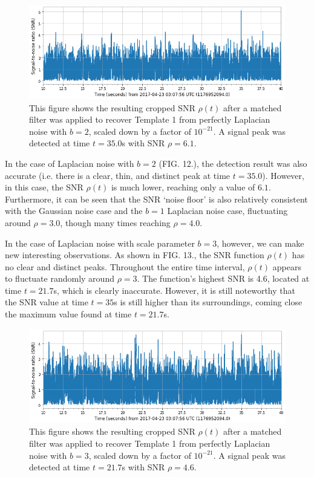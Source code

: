 \documentclass[reprint,
letterpaper,
 amsmath,amssymb,
 aps,
]{revtex4-2}
\begin{document}
\begin{figure}[h!]
\caption{This figure shows the resulting cropped SNR $\rho(t)$ after a matched filter was applied to recover Template 1 from perfectly Laplacian noise with $b=2$, scaled down by a factor of $10^{-21}$. A signal peak was detected at time $t = 35.0$s with SNR $\rho = 6.1$.}
\includegraphics[scale = .33]{laplacian b=2 template 1.png}
\centering
\end{figure} 
In the case of Laplacian noise with $b=2$ (FIG. 12.), the detection result was also accurate (i.e. there is a clear, thin, and distinct peak at time $t=35.0$). However, in this case, the SNR $\rho(t)$ is much lower, reaching only a value of $6.1$. Furthermore, it can be seen that the SNR `noise floor' is also relatively consistent with the Gaussian noise case and the $b=1$ Laplacian noise case, fluctuating around $\rho = 3.0$, though many times reaching $\rho = 4.0$.

In the case of Laplacian noise with scale parameter $b=3$, however, we can make new interesting observations. As shown in FIG. 13., the SNR function $\rho(t)$ has no clear and distinct peaks. Throughout the entire time interval, $\rho(t)$ appears to fluctuate randomly around $\rho = 3$. The function's highest SNR is 4.6, located at time $t=21.7$s, which is clearly inaccurate. However, it is still noteworthy that the SNR value at time $t=35$s is still higher than its surroundings, coming close the maximum value found at time $t=21.7$s.

\begin{figure}[H]
\caption{This figure shows the resulting cropped SNR $\rho(t)$ after a matched filter was applied to recover Template 1 from perfectly Laplacian noise with $b=3$, scaled down by a factor of $10^{-21}$. A signal peak was detected at time $t = 21.7$s with SNR $\rho = 4.6$.}
\includegraphics[scale = .33]{laplacian b=3 template 1.png}
\centering
\end{figure}
\end{document}
